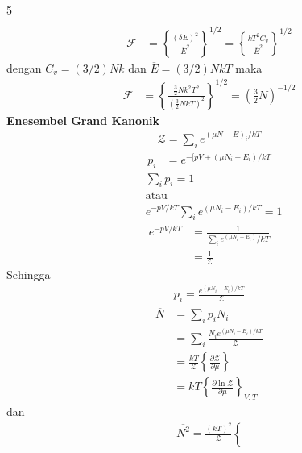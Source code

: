 \documentclass[a4paper  , 6 pt]{article}
\begin{document}
\begin{tiny}
\begin{multicols} {5}
\begin{align}
\end{align}
\begin{align}
\mathcal{F} & = \left \lbrace \frac{\overline{(\delta E)^2}}{\overline{E}^2} \right \rbrace^{1/2} = \left \lbrace \frac{kT^2 C_v }{\overline{E}^2}\right \rbrace^{1/2}
\end{align}
dengan $C_v = (3/2) Nk$ dan $\overline{E} = (3/2)NkT$ maka 
\begin{align}
\mathcal{F} &= \left \lbrace \frac{\frac{3}{2} N k^2 T^2 }{\left( \frac{3}{2} Nk T\right)^2} \right \rbrace^{1/2}= \left( \frac{3}{2} N\right)^{- 1/2 }
\end{align}
\newline
\textbf{Enesembel Grand Kanonik}
\begin{align}
\boldsymbol{\mathcal{Z} }= \sum_i e^{(\mu N - E)_i / kT }  \label{partisi grand kanonik}
\end{align}
\begin{align}
p_i &=  e^{-[ pV + (\mu N_i - E_i )/k T}
 \label{peluang grand kanonik}
\end{align}
\begin{align}
&\sum_i p_i  = 1  \\
& \text{atau } \\
 &  e^{- pV /kT} \sum_i e^{(\mu N_i  - E_i )/kT} = 1
\end{align}
\begin{align}
  e^{- pV/kT}& = \frac{1}{\sum_i e^(\mu N_i - E_i )/kT} \nonumber  \\
&  = \frac{1}{\boldsymbol{\mathcal{Z}} } \label{identitas grand kanonik}
\end{align}
Sehingga 
\begin{align}
p_i = \frac{e^{(\mu N_i - E_i )/kT}}{\boldsymbol{\mathcal{Z}}} 
\end{align}
\begin{align}
\overline{N}& =  \sum_i p_i N_i \nonumber \\
 & = \sum_i \frac{N_i e^{(\mu N_i - E_i )/kT}}{\boldsymbol{\mathcal{Z}}} \nonumber \\
& = \frac{kT}{\boldsymbol{\mathcal{Z}}} \left \lbrace \frac{\partial \boldsymbol{\mathcal{Z}}}{\partial \mu }\right \rbrace \nonumber \\
& = kT \left \lbrace \frac{\partial \ln \boldsymbol{\mathcal{Z}}}{\partial \mu} \right \rbrace_{V,T} 
  \label{jumlah rata-rata partikel}
\end{align}
dan 
\begin{align}
\overline{N^2} = \frac{(kT)^2}{\boldsymbol{\mathcal{Z}}} \left \lbrace 

\end{align}
\end{multicols}
\end{tiny}
\end{document}
